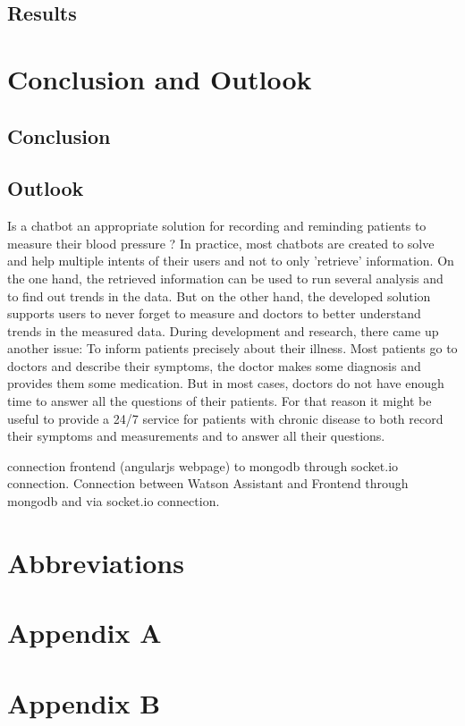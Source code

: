 \section{Results}

\chapter{Conclusion and Outlook }
\section{Conclusion}

\section{Outlook}
Is a chatbot an appropriate solution for recording and reminding patients to measure their blood pressure ? 
In practice, most chatbots are created to solve and help multiple intents of their users and not to only 'retrieve' information.
On the one hand, the retrieved information can be used to run several analysis and to find out trends in the data. But on the other hand, the developed solution  supports users to never forget to measure and doctors to better understand trends in the measured data.
During development and research, there came up another issue: To inform patients precisely about their illness. Most patients go to doctors and describe their symptoms, the doctor makes some diagnosis and provides them some medication. But in most cases, doctors do not have enough time to answer all the questions of their patients. For that reason it might be useful to provide a 24/7 service for patients with chronic disease to both record their symptoms and measurements and to answer all their questions.


connection frontend (angularjs webpage) to mongodb through socket.io connection.
Connection between Watson Assistant and Frontend through mongodb and via socket.io connection.




\chapter{Abbreviations}

\printbibliography

\chapter{Appendix A}\label{appendix a}

\chapter{Appendix B}\label{appendix b}
%


